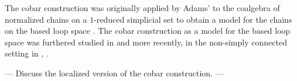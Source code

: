 The cobar construction was originally applied by Adams' to the coalgebra of normalized chains on a $1$-reduced simplicial set to obtain a model for the chains on the based loop space \cite{Adams}. The cobar construction as a model for the based loop space was furthered studied in \cite{Baues} and more recently, in the non-simply connected setting in \cite{Hess-Tonks}, \cite{Rivera-Zeinalian}.


---
Discuss the localized version of the cobar construction. ---